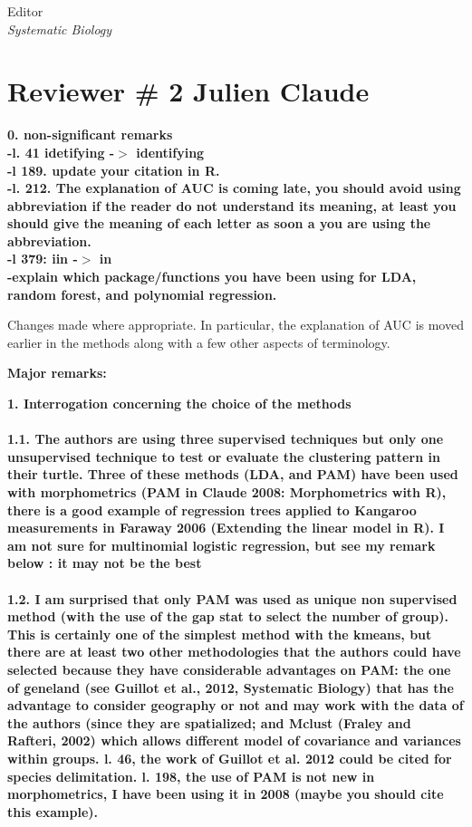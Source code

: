 \documentclass{letter}
\begin{document}
\begin{letter}{Editor \\ \textit{Systematic Biology}}
  \section{Reviewer \# 2 Julien Claude}

  \textbf{0. non-significant remarks \\
    -l. 41 idetifying -\(>\) identifying \\
    -l 189. update your citation in R. \\
    -l. 212. The explanation of AUC is coming late, you should avoid using abbreviation if the reader do not understand its meaning, at least you should give the meaning of each letter as soon a you are using the abbreviation. \\
    -l 379: iin -\(>\) in \\
  -explain which package/functions you have been using for LDA, random forest, and polynomial regression.}

  Changes made where appropriate. In particular, the explanation of AUC is moved earlier in the methods along with a few other aspects of terminology.


  \textbf{Major remarks: }

  \textbf{1. Interrogation concerning the choice of the methods \\\\
    1.1. The authors are using three supervised techniques but only one unsupervised technique to test or evaluate the clustering pattern in their turtle. Three of these methods (LDA, and PAM) have been used with morphometrics (PAM in Claude 2008: Morphometrics with R), there is a good example of regression trees applied to Kangaroo measurements in Faraway 2006 (Extending the linear model in R). I am not sure for multinomial logistic regression, but see my remark below : it may not be the best\\\\
  1.2. I am surprised that only PAM was used as unique non supervised method (with the use of the gap stat to select the number of group). This is certainly one of the simplest method with the kmeans, but there are at least two other methodologies that the authors could have selected because they have considerable advantages on PAM: the one of geneland (see Guillot et al., 2012, Systematic Biology) that has the advantage to consider geography or not and may work with the data of the authors (since they are spatialized; and Mclust (Fraley and Rafteri, 2002) which allows different model of covariance and variances within groups. l. 46, the work of Guillot et al. 2012 could be cited for species delimitation. l. 198, the use of PAM is not new in morphometrics, I have been using it in 2008 (maybe you should cite this example). }


\end{letter}
\end{document}
